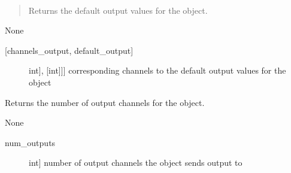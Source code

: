 \documentclass[letterpaper,10pt,english]{sphinxmanual}
\begin{document}
\begin{fulllineitems}
\begin{fulllineitems}
\begin{description}
\end{description}

\end{fulllineitems}


\begin{fulllineitems}
\label{\detokenize{base:OutputObject.OutputObject.get_default_outputs}}~\begin{quote}

\sphinxAtStartPar
Returns the default output values for the object.
\end{quote}

\sphinxAtStartPar
{}

\sphinxAtStartPar
None

\sphinxAtStartPar
{}
\begin{description}
\item[{{[}channels\_output, default\_output{]}}] \leavevmode{[}{[}{[}int{]}, {[}int{]}{]}{]}
\sphinxAtStartPar
corresponding channels to the default output values for the object

\end{description}

\end{fulllineitems}


\begin{fulllineitems}
\label{\detokenize{base:OutputObject.OutputObject.get_num_channels}}
\sphinxAtStartPar
Returns the number of output channels for the object.

\sphinxAtStartPar
{}

\sphinxAtStartPar
None

\sphinxAtStartPar
{}
\begin{description}
\item[{num\_outputs}] \leavevmode{[}int{]}
\sphinxAtStartPar
number of output channels the object sends output to

\end{description}


\end{fulllineitems}
\end{fulllineitems}
\end{document}
